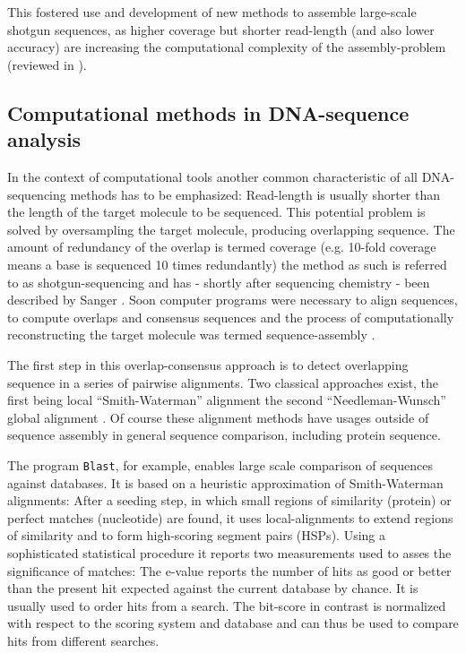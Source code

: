This fostered use and development of new methods to assemble
large-scale shotgun sequences, as higher coverage but shorter
read-length (and also lower accuracy) are increasing the computational
complexity of the assembly-problem (reviewed in \cite{pmid20211242}).

\subsection{Computational methods in DNA-sequence analysis}
\label{sec:comp-meth-dna}

In the context of computational tools another common characteristic of
all DNA-sequencing methods has to be emphasized: Read-length is
usually shorter than the length of the target molecule to be
sequenced. This potential problem is solved by oversampling the target
molecule, producing overlapping sequence. The amount of redundancy of
the overlap is termed coverage (e.g. 10-fold coverage means a base is
sequenced 10 times redundantly) the method as such is referred to as
shotgun-sequencing and has - shortly after sequencing chemistry - been
described by Sanger \cite{pmid6260957}. Soon computer programs were
necessary to align sequences, to compute overlaps and consensus
sequences \cite{pmid461197} and the process of computationally
reconstructing the target molecule was termed sequence-assembly
\cite{pmid6251542}.

The first step in this overlap-consensus approach is to detect
overlapping sequence in a series of pairwise alignments. Two classical
approaches exist, the first being local ``Smith-Waterman'' alignment
\cite{pmid7265238} the second ``Needleman-Wunsch'' global alignment
\cite{pmid7334527}. Of course these alignment methods have usages
outside of sequence assembly in general sequence comparison, including
protein sequence.

The program \texttt{Blast}, for example, enables large scale
comparison of sequences against databases. It is based on a heuristic
approximation of Smith-Waterman alignments: After a seeding step, in
which small regions of similarity (protein) or perfect matches
(nucleotide) are found, it uses local-alignments to extend regions of
similarity and to form high-scoring segment pairs (HSPs). Using a
sophisticated statistical procedure it reports two measurements used
to asses the significance of matches: The e-value reports the number
of hits as good or better than the present hit expected against the
current database by chance. It is usually used to order hits from a
search. The bit-score in contrast is normalized with respect to the
scoring system and database and can thus be used to compare hits from
different searches.

